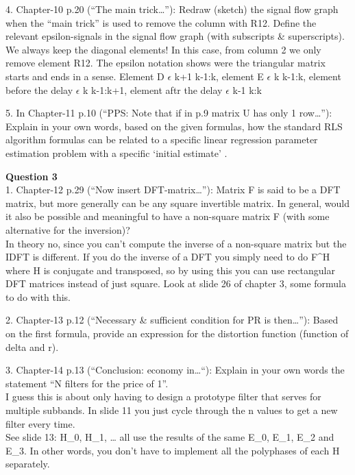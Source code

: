 \documentclass[
  a4paper,
  ,captions=tableheading
]{scrartcl}
\begin{document}
4. Chapter-10 p.20 (``The main trick\ldots''): Redraw (sketch) the
signal flow graph when the ``main trick'' is used to remove the column
with R12. Define the relevant epsilon-signals in the signal flow graph
(with subscripts \& superscripts).\\
We always keep the diagonal elements! In this case, from column 2 we
only remove element R12. The epsilon notation shows were the triangular
matrix starts and ends in a sense. Element D \(\epsilon\) k+1 k-1:k,
element E \(\epsilon\) k k-1:k, element before the delay \(\epsilon\) k
k-1:k+1, element aftr the delay \(\epsilon\) k-1 k:k

5. In Chapter-11 p.10 (``PPS: Note that if in p.9 matrix U has only 1
row\ldots''): Explain in your own words, based on the given formulas,
how the standard RLS algorithm formulas can be related to a specific
linear regression parameter estimation problem with a specific `initial
estimate' .

\textbf{Question 3}\\
1. Chapter-12 p.29 (``Now insert DFT-matrix\ldots''): Matrix F is said
to be a DFT matrix, but more generally can be any square invertible
matrix. In general, would it also be possible and meaningful to have a
non-square matrix F (with some alternative for the inversion)?\\
In theory no, since you can't compute the inverse of a non-square matrix
but the IDFT is different. If you do the inverse of a DFT you simply
need to do F\^{}H where H is conjugate and transposed, so by using this
you can use rectangular DFT matrices instead of just square. Look at
slide 26 of chapter 3, some formula to do with this.

2. Chapter-13 p.12 (``Necessary \& sufficient condition for PR is
then\ldots''): Based on the first formula, provide an expression for the
distortion function (function of delta and r).

3. Chapter-14 p.13 (``Conclusion: economy in\ldots``): Explain in your
own words the statement ``N filters for the price of 1''.\\
I guess this is about only having to design a prototype filter that
serves for multiple subbands. In slide 11 you just cycle through the n
values to get a new filter every time.\\
See slide 13: H\_0, H\_1, \ldots{} all use the results of the same E\_0,
E\_1, E\_2 and E\_3. In other words, you don't have to implement all the
polyphases of each H separately.
\end{document}
